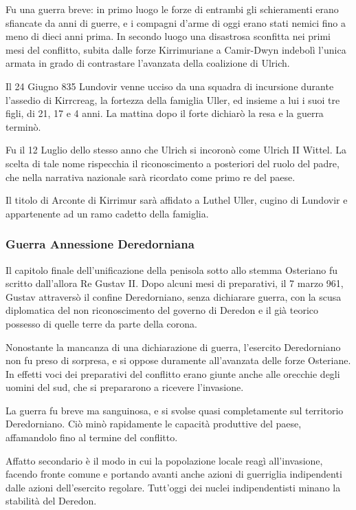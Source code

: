 Fu una guerra breve: in primo luogo le forze di entrambi gli schieramenti erano sfiancate da anni di guerre, e i compagni d'arme di oggi erano stati nemici fino a meno di dieci anni prima. In secondo luogo una disastrosa sconfitta nei primi mesi del conflitto, subita dalle forze Kirrimuriane a Camir-Dwyn indebolì l'unica armata in grado di contrastare l'avanzata della coalizione di Ulrich.

Il 24 Giugno 835 Lundovir venne ucciso da una squadra di incursione durante l'assedio di Kirrcreag, la fortezza della famiglia Uller, ed insieme a lui i suoi tre figli, di 21, 17 e 4 anni. La mattina dopo il forte dichiarò la resa e la guerra terminò.

Fu il 12 Luglio dello stesso anno che Ulrich si incoronò come Ulrich II Wittel. La scelta di tale nome rispecchia il riconoscimento a posteriori del ruolo del padre, che nella narrativa nazionale sarà ricordato come primo re del paese.

Il titolo di Arconte di Kirrimur sarà affidato a Luthel Uller, cugino di Lundovir e appartenente ad un ramo cadetto della famiglia.


\subsubsection{Guerra Annessione Deredorniana}
Il capitolo finale dell'unificazione della penisola sotto allo stemma Osteriano fu scritto dall'allora Re Gustav II. Dopo alcuni mesi di preparativi, il 7 marzo 961, Gustav attraversò il confine Deredorniano, senza dichiarare guerra, con la scusa diplomatica del non riconoscimento del governo di Deredon e il già teorico possesso di quelle terre da parte della corona.

Nonostante la mancanza di una dichiarazione di guerra, l'esercito Deredorniano non fu preso di sorpresa, e si oppose duramente all'avanzata delle forze Osteriane. In effetti voci dei preparativi del conflitto erano giunte anche alle orecchie degli uomini del sud, che si prepararono a ricevere l'invasione.

La guerra fu breve ma sanguinosa, e si svolse quasi completamente sul territorio Deredorniano. Ciò minò rapidamente le capacità produttive del paese, affamandolo fino al termine del conflitto.

Affatto secondario è il modo in cui la popolazione locale reagì all'invasione, facendo fronte comune e portando avanti anche azioni di guerriglia indipendenti dalle azioni dell'esercito regolare. Tutt'oggi dei nuclei indipendentisti minano la stabilità del Deredon.

